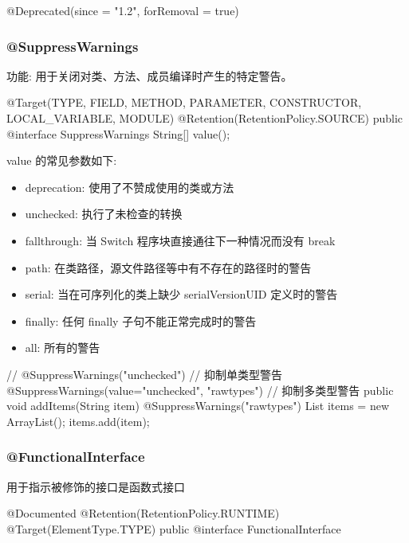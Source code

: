 \begin{Java}
@Deprecated(since = "1.2", forRemoval = true)
\end{Java}

\subsubsection*{@SuppressWarnings}

功能: 用于关闭对类、方法、成员编译时产生的特定警告。

\begin{Java}
@Target({TYPE, FIELD, METHOD, PARAMETER, CONSTRUCTOR, LOCAL_VARIABLE, MODULE})
@Retention(RetentionPolicy.SOURCE)
public @interface SuppressWarnings {
    String[] value();
}
\end{Java}

value 的常见参数如下:
\begin{itemize}
    \item deprecation: 使用了不赞成使用的类或方法
    \item unchecked: 执行了未检查的转换
    \item fallthrough: 当 Switch 程序块直接通往下一种情况而没有 break
    \item path: 在类路径，源文件路径等中有不存在的路径时的警告
    \item serial: 当在可序列化的类上缺少 serialVersionUID 定义时的警告
    \item finally: 任何 finally 子句不能正常完成时的警告
    \item all: 所有的警告
\end{itemize}

\begin{Java}
// @SuppressWarnings("unchecked")                   // 抑制单类型警告
@SuppressWarnings(value={"unchecked", "rawtypes"})  // 抑制多类型警告
public void addItems(String item){  
  @SuppressWarnings("rawtypes")  
   List items = new ArrayList();  
   items.add(item);  
}
\end{Java}

\subsubsection*{@FunctionalInterface}

用于指示被修饰的接口是函数式接口
\begin{Java}
@Documented
@Retention(RetentionPolicy.RUNTIME)
@Target(ElementType.TYPE)
public @interface FunctionalInterface {}
\end{Java}

